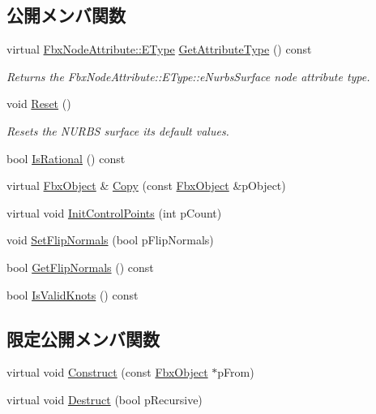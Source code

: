 \subsection*{公開メンバ関数}
\begin{DoxyCompactItemize}
\item 
virtual \hyperlink{class_fbx_node_attribute_a08e1669d3d1a696910756ab17de56d6a}{Fbx\+Node\+Attribute\+::\+E\+Type} \hyperlink{class_fbx_nurbs_surface_a7c075984ec95a01b9cb6031e19cbd0cf}{Get\+Attribute\+Type} () const
\begin{DoxyCompactList}\small\item\em Returns the Fbx\+Node\+Attribute\+::\+E\+Type\+::e\+Nurbs\+Surface node attribute type. \end{DoxyCompactList}\item 
void \hyperlink{class_fbx_nurbs_surface_adb9af63ca3aff4ace0f36686dc49ec27}{Reset} ()
\begin{DoxyCompactList}\small\item\em Resets the N\+U\+R\+BS surface its default values. \end{DoxyCompactList}\item 
bool \hyperlink{class_fbx_nurbs_surface_a63da464e4d5624d7615c69047a922fca}{Is\+Rational} () const
\item 
virtual \hyperlink{class_fbx_object}{Fbx\+Object} \& \hyperlink{class_fbx_nurbs_surface_a1da47f75af4920a3fb4a94690d8ada8c}{Copy} (const \hyperlink{class_fbx_object}{Fbx\+Object} \&p\+Object)
\item 
virtual void \hyperlink{class_fbx_nurbs_surface_ab4ba96b12b96a6adc0f95f345e3f3abd}{Init\+Control\+Points} (int p\+Count)
\item 
void \hyperlink{class_fbx_nurbs_surface_a0fc7b33859f68a6ad3f72e21162f9f6d}{Set\+Flip\+Normals} (bool p\+Flip\+Normals)
\item 
bool \hyperlink{class_fbx_nurbs_surface_a6152d497e060bcfbab110748e7aa6839}{Get\+Flip\+Normals} () const
\item 
bool \hyperlink{class_fbx_nurbs_surface_a1187437512afcb9a2ea309255e4bee82}{Is\+Valid\+Knots} () const
\end{DoxyCompactItemize}
\subsection*{限定公開メンバ関数}
\begin{DoxyCompactItemize}
\item 
virtual void \hyperlink{class_fbx_nurbs_surface_a3487d194007af1729d31dc9dfa0b12c9}{Construct} (const \hyperlink{class_fbx_object}{Fbx\+Object} $\ast$p\+From)
\item 
virtual void \hyperlink{class_fbx_nurbs_surface_ab9ff252170ad2dc35958af782962a5c9}{Destruct} (bool p\+Recursive)
\end{DoxyCompactItemize}

